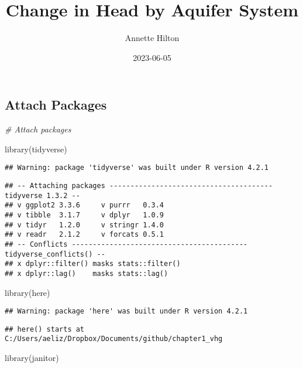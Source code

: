 \documentclass[
]{article}
\title{Change in Head by Aquifer System}
\author{Annette Hilton}
\date{2023-06-05}
\newenvironment{Shaded}{\begin{snugshade}}{\end{snugshade}}
\newcommand{\CommentTok}[1]{\textcolor[rgb]{0.56,0.35,0.01}{\textit{#1}}}
\newcommand{\FunctionTok}[1]{\textcolor[rgb]{0.00,0.00,0.00}{#1}}
\newcommand{\NormalTok}[1]{#1}
\begin{document}
\maketitle

\hypertarget{attach-packages}{%
\subsection{Attach Packages}\label{attach-packages}}

\begin{Shaded}
\begin{Highlighting}[]
\CommentTok{\# Attach packages }

\FunctionTok{library}\NormalTok{(tidyverse)}
\end{Highlighting}
\end{Shaded}

\begin{verbatim}
## Warning: package 'tidyverse' was built under R version 4.2.1
\end{verbatim}

\begin{verbatim}
## -- Attaching packages --------------------------------------- tidyverse 1.3.2 --
## v ggplot2 3.3.6     v purrr   0.3.4
## v tibble  3.1.7     v dplyr   1.0.9
## v tidyr   1.2.0     v stringr 1.4.0
## v readr   2.1.2     v forcats 0.5.1
## -- Conflicts ------------------------------------------ tidyverse_conflicts() --
## x dplyr::filter() masks stats::filter()
## x dplyr::lag()    masks stats::lag()
\end{verbatim}

\begin{Shaded}
\begin{Highlighting}[]
\FunctionTok{library}\NormalTok{(here)}
\end{Highlighting}
\end{Shaded}

\begin{verbatim}
## Warning: package 'here' was built under R version 4.2.1
\end{verbatim}

\begin{verbatim}
## here() starts at C:/Users/aeliz/Dropbox/Documents/github/chapter1_vhg
\end{verbatim}

\begin{Shaded}
\begin{Highlighting}[]
\FunctionTok{library}\NormalTok{(janitor)}
\end{Highlighting}
\end{Shaded}
\end{document}

